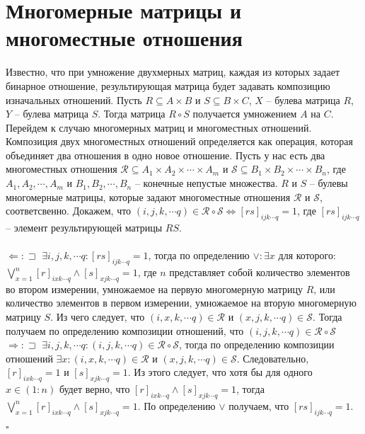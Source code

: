 \documentclass{article}
\begin{document}
\section{Многомерные матрицы и многоместные отношения}
Известно, что при умножение двухмерных матриц, каждая из которых задает бинарное отношение, результирующая матрица будет задавать композицию изначальных отношений. 
Пусть $R \subseteq A \times B$ и $S \subseteq B \times C$, $X$ -- булева матрица $R$, $Y$ -- булева матрица $S$. Тогда матрица $R \circ S $ получается умножением $A$ на $C$.
\\

Перейдем к случаю многомерных матриц и многоместных отношений. Композиция двух многоместных отношений определяется как операция, которая объединяет два отношения в одно новое отношение. Пусть у нас есть два многоместных отношения $\mathcal{R} \subseteq A_1 \times A_2 \times \cdots \times A_m$ и $\mathcal{S} \subseteq B_1 \times B_2 \times \cdots \times B_n$, где $A_1, A_2, \cdots, A_m$ и $B_1, B_2, \cdots, B_n$ -- конечные непустые множества. $R$ и $S$ -- булевы многомерные матрицы, которые задают многоместные отношения $\mathcal{R}$ и $\mathcal{S}$, соответсвенно. Докажем, что $(i,j,k, \cdots q) \in \mathcal{R} \circ \mathcal{S} \iff [rs]_{i j k\cdots q} = 1$, где $[rs]_{ijk \cdots q}$ -- элемент результирующей матрицы $RS$.\\\\
$\Leftarrow :  \sqsupset$ $\exists i, j, k, \cdots q : [rs]_{ijk\cdots q} = 1$, тогда по определению $\vee : \exists x$ для которого: $\bigvee_{x=1}^n [r]_{ixk\cdots q} \wedge [s]_{xjk\cdots q} = 1$, где $n$ представляет собой количество элементов во втором измерении, умножаемое на первую многомерную матрицу $R$, или количество элементов в первом измерении, умножаемое на вторую многомерную матрицу $S$. Из чего следует, что $(i,x,k, \cdots q) \in \mathcal{R}$ и $(x,j,k,\cdots q) \in \mathcal{S}$. Тогда получаем по определению композиции отношений, что $(i,j,k, \cdots q) \in \mathcal{R} \circ \mathcal{S}$ \\
$\Rightarrow : \sqsupset$ $\exists i, j, k, \cdots q : (i,j,k, \cdots q) \in \mathcal{R} \circ \mathcal{S}$, тогда по определению композиции отношений $\exists x: (i,x,k, \cdots q) \in \mathcal{R}$ и $(x,j,k,\cdots q) \in \mathcal{S}$. Следовательно, $[r]_{ixk\cdots q} = 1$ и $[s]_{xjk\cdots q} = 1$. Из этого следует, что хотя бы для одного $x \in (1:n)$ будет верно, что $[r]_{ixk\cdots q} \wedge [s]_{xjk\cdots q} = 1$, тогда $\bigvee_{x=1}^n [r]_{ixk\cdots q} \wedge [s]_{xjk\cdots q} = 1$. По определению $\vee$ получаем, что $[rs]_{i j k\cdots q} = 1.$
\begin{flushright}
$\square$
\end{flushright}
\\
\end{document}
